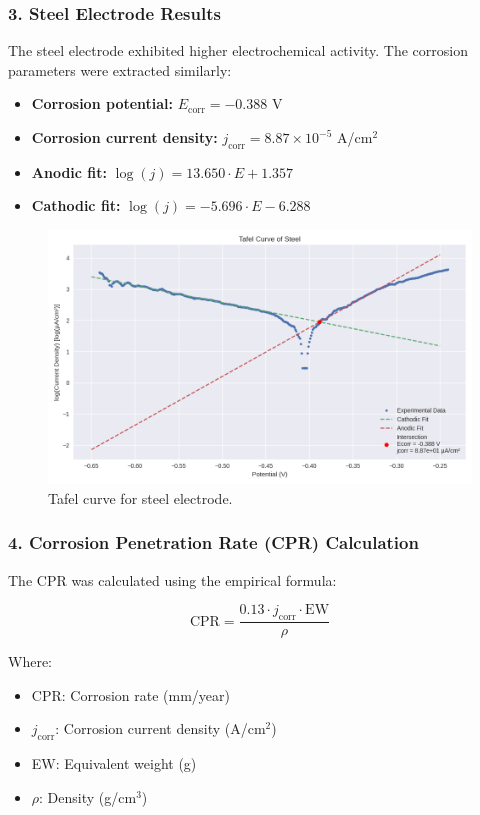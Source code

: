 \vspace{0.2cm}
\subsubsection*{3. Steel Electrode Results}

The steel electrode exhibited higher electrochemical activity. The corrosion parameters were extracted similarly:

\begin{itemize}
    \item \textbf{Corrosion potential:} \( E_{\text{corr}} = -0.388 \) V
    \item \textbf{Corrosion current density:} \( j_{\text{corr}} = 8.87 \times 10^{-5} \) A/cm\(^2\)
    \item \textbf{Anodic fit:} \( \log(j) = 13.650 \cdot E + 1.357 \)
    \item \textbf{Cathodic fit:} \( \log(j) = -5.696 \cdot E - 6.288 \)
\end{itemize}

\begin{figure}[ht!]
    \centering
    \includegraphics[width=0.7\linewidth]{Figures/TAFEL-STEEL.png}
    \caption{Tafel curve for steel electrode.}
    \label{fig:tafel_steel}
\end{figure}

\vspace{0.2cm}
\subsubsection*{4. Corrosion Penetration Rate (CPR) Calculation}

The CPR was calculated using the empirical formula:

\begin{equation}
\text{CPR} = \frac{0.13 \cdot j_{\text{corr}} \cdot \text{EW}}{\rho}
\end{equation}

Where:
\begin{itemize}
    \item CPR: Corrosion rate (mm/year)
    \item \( j_{\text{corr}} \): Corrosion current density (A/cm\(^2\))
    \item EW: Equivalent weight (g)
    \item \( \rho \): Density (g/cm\(^3\))
\end{itemize}

